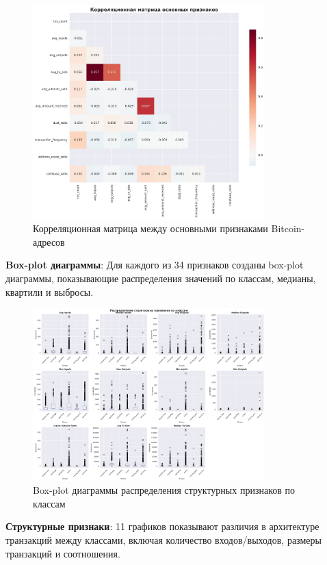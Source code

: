 \begin{figure}[H]
\centering
\includegraphics[width=0.8\textwidth]{bitcoin_data_collector/images/correlation_matrix.jpg}
\caption{Корреляционная матрица между основными признаками Bitcoin-адресов}
\label{fig:correlation_matrix}
\end{figure}

\textbf{Box-plot диаграммы}: Для каждого из 34 признаков созданы box-plot диаграммы, показывающие распределения значений по классам, медианы, квартили и выбросы.

\begin{figure}[H]
\centering
\includegraphics[width=0.8\textwidth]{bitcoin_data_collector/images/structural_features.jpg}
\caption{Box-plot диаграммы распределения структурных признаков по классам}
\label{fig:structural_features}
\end{figure}

\textbf{Структурные признаки}: 11 графиков показывают различия в архитектуре транзакций между классами, включая количество входов/выходов, размеры транзакций и соотношения.

